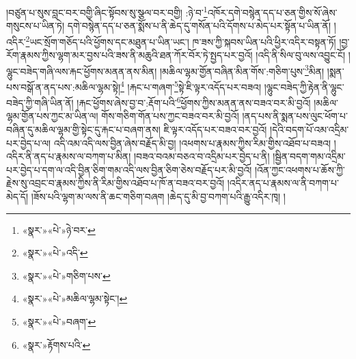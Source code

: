 །བཙུན་པ་སུས་བླང་བར་བགྱི་ཞིང་སྟོབས་སུ་སྩལ་བར་བགྱི། :ཉེ་བ་\footnote{«སྣར་»«པེ་»ཉེ་བར་}འཁོར་དགེ་བསྙེན་དད་པ་ཅན་གྱིས་སོ་ཞེས་གསུངས་པ་ཡིན་ཏེ། དགེ་བསྙེན་དད་པ་ཅན་སྨོས་པ་ནི་ཆེད་དུ་གསོན་པའི་དོགས་པ་མེད་པར་སྟོན་པ་ཡིན་ནོ། །འདིར་\footnote{«སྣར་»«པེ་»འདི་}ཡང་སྲོག་གཅོད་པའི་ཕྱོགས་དང་མཐུན་པ་ཡིན་ཡང་། ཁ་ཟས་ཀྱི་སྐབས་ཡིན་པའི་ཕྱིར་འདིར་བསྟན་ཏོ། །བྱ་རོག་རྣམས་ཀྱིས་ལྷག་མར་བྱས་པའི་ཟས་ནི་མཆུའི་ཐན་ཀོར་བོར་ཏེ་སྤྱད་པར་བྱའོ། །འདི་ནི་སིལ་བུ་ལས་འབྱུང་ངོ། །ལྷུང་བཟེད་གཞི་ལས་རྐང་ཕྱོགས་མནན་ནས་མིན། །མཆིལ་ལྷམ་གྱོན་བཞིན་མིན་གོས་:གཅིག་པུས་\footnote{«སྣར་»«པེ་»གཅིག་པས་}མིན། །སྨན་པས་བསྒོ་ན་ནད་པས་:མཆིལ་ལྷམ་སྟེ།\footnote{«སྣར་»«པེ་»མཆིལ་ལྷམ་སྟེང་།} །རྐང་པ་གཞག་\footnote{«སྣར་»«པེ་»བཞག་}སྟེ་ཇི་ལྟར་འདོད་པར་བཟའ། །ལྷུང་བཟེད་ཀྱི་རྟེན་ནི་ལྷུང་བཟེད་ཀྱི་གཞི་ཡིན་ནོ། །རྐང་ཕྱོགས་ཞེས་བྱ་བ་:རྡོག་པའི་\footnote{«སྣར་»རྟོགས་པའི་}ཕྱོགས་ཀྱིས་མནན་ནས་བཟའ་བར་མི་བྱའོ། །མཆིལ་ལྷམ་གྱོན་པས་ཀྱང་མ་ཡིན་ལ། གོས་གཅིག་གོན་པས་ཀྱང་བཟའ་བར་མི་བྱའོ། །ནད་པས་ནི་སྨན་པས་ལུང་ཕོག་པ་བཞིན་དུ་མཆིལ་ལྷམ་གྱི་སྟེང་དུ་རྐང་པ་བཞག་ནས། ཇི་ལྟར་འདོད་པར་བཟའ་བར་བྱའོ། །དེའི་བདག་པོ་འམ་འདྲིམ་པར་བྱེད་པ་ལ། འདི་འམ་འདི་ལས་བྱིན་ཞེས་བརྗོད་མི་བྱ། །འཕགས་པ་རྣམས་ཀྱིས་རིམ་གྱིས་འཐོབ་པ་བཟའ། །འདིར་ནི་ནད་པ་རྣམས་ལ་བཀག་པ་མིན། །བཟའ་བའམ་བཅའ་བ་འདྲིམ་པར་བྱེད་པ་ནི། །སྦྱིན་བདག་གམ་འདྲིམ་པར་བྱེད་པ་དག་ལ་འདི་བྱིན་ཅིག་གམ་འདི་ལས་བྱིན་ཅིག་ཅེས་བརྗོད་པར་མི་བྱའོ། །འོན་ཀྱང་འཕགས་པ་ཆོས་ཀྱི་རྗེས་སུ་འབྲང་བ་རྣམས་ཀྱིས་ནི་རིམ་གྱིས་འཐོབ་པ་ཁོ་ན་བཟའ་བར་བྱའོ། །འདིར་ནད་པ་རྣམས་ལ་ནི་བཀག་པ་མེད་དོ། །ཟོས་པའི་ལྷག་མ་ལས་ནི་ཆང་གཅིག་བཞག །ཆེད་དུ་མི་བྱ་བཀག་པའི་རྒྱུ་འདིར་ཁྭ། །
